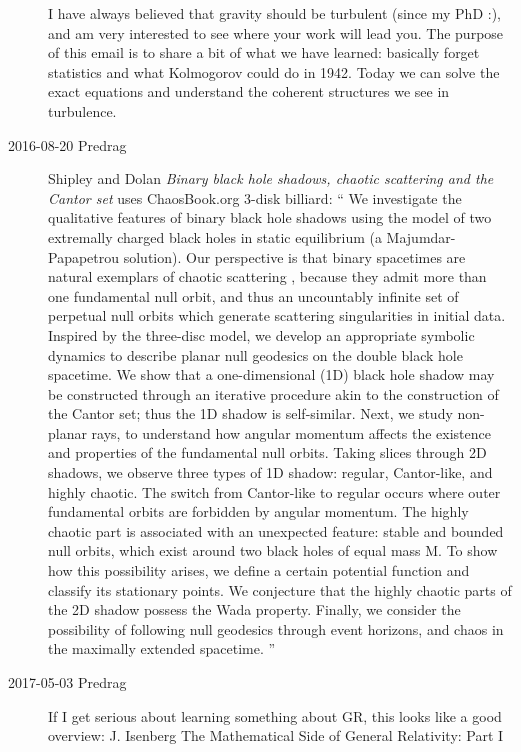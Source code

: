 \begin{description}
I have always believed that gravity should be turbulent (since my PhD :),
and am very interested to see where your work will lead you. The purpose
of this email is to share a bit of what we have learned: basically forget
statistics and what Kolmogorov could do in 1942. Today we can solve the
exact equations and understand the coherent structures we see in
turbulence.

\item[2016-08-20 Predrag]
Shipley and Dolan
{\em Binary black hole shadows, chaotic scattering and the {Cantor} set}
uses ChaosBook.org 3-disk billiard: ``
We investigate the qualitative features of binary black hole shadows
using the model of two extremally charged black holes in static
equilibrium (a Majumdar-Papapetrou solution). Our perspective is that
binary spacetimes are natural exemplars of chaotic scattering , because
they admit more than one fundamental null orbit, and thus an uncountably
infinite set of perpetual null orbits which generate scattering
singularities in initial data. Inspired by the three-disc model, we
develop an appropriate symbolic dynamics to describe planar null
geodesics on the double black hole spacetime. We show that a
one-dimensional (1D) black hole shadow may be constructed through an
iterative procedure akin to the construction of the Cantor set; thus the
1D shadow is self-similar. Next, we study non-planar rays, to understand
how angular momentum affects the existence and properties of the
fundamental null orbits. Taking slices through 2D shadows, we observe
three types of 1D shadow: regular, Cantor-like, and highly chaotic. The
switch from Cantor-like to regular occurs where outer fundamental orbits
are forbidden by angular momentum. The highly chaotic part is associated
with an unexpected feature: stable and bounded null orbits, which exist
around two black holes of equal mass M. To show how this possibility
arises, we define a certain potential function and classify its
stationary points. We conjecture that the highly chaotic parts of the 2D
shadow possess the Wada property. Finally, we consider the possibility of
following null geodesics through event horizons, and chaos in the
maximally extended spacetime.
''

\item[2017-05-03 Predrag]
If I get serious about learning something about GR, this looks like a good
overview:
J. Isenberg
{The Mathematical Side of General Relativity: Part I}


\end{description}
